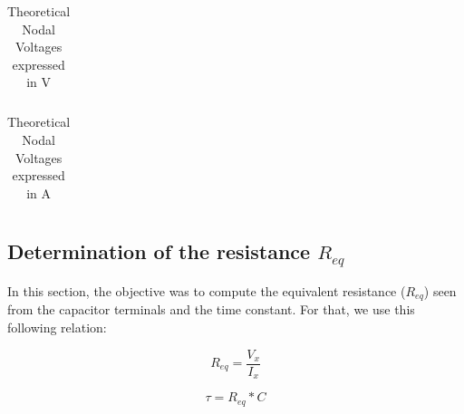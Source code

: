 \begin{table}[h]
\centering
\begin{tabularx}{0.6\textwidth} {
  | >{\raggedright\arraybackslash}X
  | >{\raggedleft\arraybackslash}X | }
 \hline

\end{tabularx}
\caption{Theoretical Nodal Voltages expressed in V}
\end{table}

\begin{table}[h]
\centering
\begin{tabularx}{0.6\textwidth} {
  | >{\raggedright\arraybackslash}X
  | >{\raggedleft\arraybackslash}X | }
 \hline

\end{tabularx}
\caption{Theoretical Nodal Voltages expressed in A}
\end{table}





\subsection{Determination of the resistance $R_{eq}$}

In this section, the objective was to compute the equivalent resistance ($R_{eq}$) seen from the capacitor terminals and the time constant. For that, we use this following relation:

\begin{equation}
R_{eq} = \frac{V_x}{I_x}
\end{equation}

\begin{equation}
\tau=R_{eq} * C
\end{equation}

